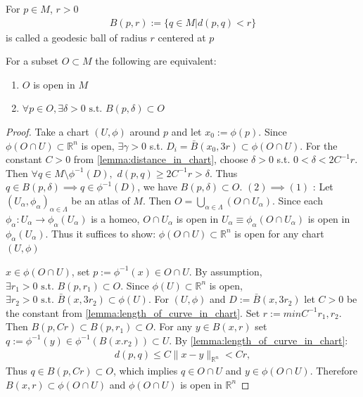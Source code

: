\begin{definition}
    For $p\in M$, $r>0$
    \[
    \begin{aligned}
        B(p,r) := \{q \in M | d(p,q) < r\}
    \end{aligned}
    \]
    is called a geodesic ball of radius $r$ centered at $p$
\end{definition}

\begin{proposition}
    For a subset $O \subset M$ the following are equivalent:
    \begin{enumerate}
        \item $O$ is open in $M$
        \item $\forall p \in O, \exists \delta > 0 \text{ s.t. } B(p, \delta) \subset O$
    \end{enumerate}
    \label{prop:open_in_manifold}
\end{proposition}

\begin{proof}
    Take a chart $(U, \phi)$ around $p$ and let $x_0 := \phi(p)$. Since $\phi(O \cap U) \subset \mathbb{R}^n$ is open,
    $\exists \gamma > 0$ s.t. $D_i = \bar{B}(x_0, 3r) \subset \phi(O \cap U)$. For the constant $C>0$ from \autoref{lemma:distance_in_chart}, choose $\delta >0$ s.t.
    $0 < \delta < 2 C^{-1}r$. Then $\forall q \in M \setminus \phi^{-1}(D),$
    $d(p,q) \geq 2C^{-1}r > \delta$. Thus $q \in B(p, \delta) \implies q \in \phi^{-1}(D)$,
    we have $B(p,\delta) \subset O$.
    $(2) \implies (1)$ : Let ${(U_{\alpha}, \phi_{\alpha})}_{\alpha \in \Lambda}$ be an atlas of $M$. Then $O = \bigcup_{\alpha \in \Lambda} (O \cap U_{\alpha})$.
    Since each $\phi_{\alpha} : U_{\alpha} \to \phi_{\alpha} (U_{\alpha})$ is a homeo,
    $O \cap U_{\alpha}$ is open in $U_{\alpha} \equiv \phi_{\alpha} (O \cap U_{\alpha})$ is open in $\phi_{\alpha}(U_{\alpha})$.
    Thus it suffices to show: $\phi (O \cap U) \subset \mathbb{R}^n $ is open for any chart $(U, \phi)$

    $x \in \phi(O \cap U)$, set $p := \phi^{-1}(x) \in O \cap U$. By assumption, $\exists r_1 >0 \text{ s.t. } B(p, r_1) \subset O$.
    Since $\phi (U) \subset \mathbb{R}^n$ is open, $\exists r_2>0 \text{ s.t. } \bar{B}(x, 3 r_2) \subset \phi(U)$.
    For $(U, \phi)$ and $D := \bar{B}(x, 3 r_2)$ let $C>0$ be the constant from \autoref{lemma:length_of_curve_in_chart}. Set $r:= min{C^{-1}r_1, r_2}$.
    Then $B(p, C r) \subset B(p, r_1) \subset O$. For any $y \in B(x, r)$ set $q := \phi^{-1}(y) \in \phi^{-1}(B(x. r_2)) \subset U$. By \autoref{lemma:length_of_curve_in_chart}:
    \[
    \begin{aligned}
        d(p,q) \leq C \| x-y \|_{\mathbb{R}^n} < C r,
    \end{aligned}
    \]
    Thus $q \in B(p, Cr) \subset O$, which implies $q \in O \cap U$ and $y \in \phi(O \cap U)$. Therefore $B(x,r) \subset \phi(O \cap U)$ and $\phi(O \cap U)$ is open in $\mathbb{R}^n$
\end{proof}


